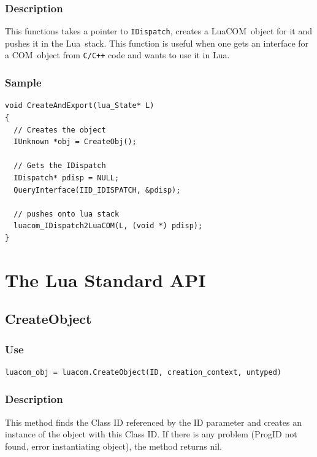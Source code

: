 \documentclass[11pt,a4paper,english]{report}
\newcommand{\ident}[1]{\mbox{\texttt{#1}}}
\newcommand{\techname}[1]{\mbox{#1}}
\newcommand{\lua}{\techname{Lua}}
\newcommand{\com}{\techname{COM}}
\newcommand{\luacom}{\techname{LuaCOM}}
\begin{document}
\subsubsection*{Description}
This functions takes a pointer to \ident{IDispatch}, creates a
\luacom\ object for it and pushes it in the \lua\ stack. This function
is useful when one gets an interface for a \com\ object from
\ident{C/C++} code and wants to use it in \lua.


\subsubsection*{Sample}

\begin{verbatim}
void CreateAndExport(lua_State* L)
{
  // Creates the object
  IUnknown *obj = CreateObj();

  // Gets the IDispatch
  IDispatch* pdisp = NULL;
  QueryInterface(IID_IDISPATCH, &pdisp);

  // pushes onto lua stack
  luacom_IDispatch2LuaCOM(L, (void *) pdisp);
}
\end{verbatim}


\section{The Lua Standard API}


\subsection*{CreateObject}

\subsubsection*{Use}

\begin{verbatim}
luacom_obj = luacom.CreateObject(ID, creation_context, untyped)
\end{verbatim}

\subsubsection*{Description}
This method finds the Class ID referenced by the ID parameter
and creates an instance of the object with this Class ID. If there
is any problem (ProgID not found, error instantiating object), the
method returns nil.
\end{document}
